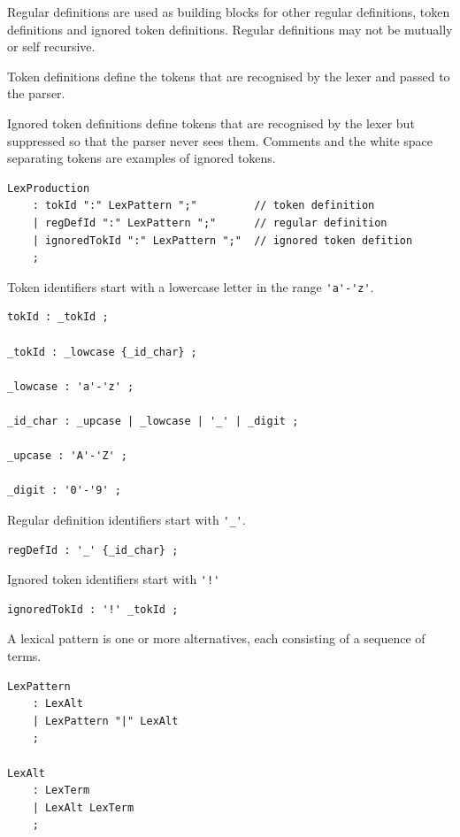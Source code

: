 \documentclass[12pt]{article}
\begin{document}
Regular definitions are used as building blocks for other regular definitions, token definitions and ignored token definitions. Regular definitions may not be mutually or self recursive.

Token definitions define the tokens that are recognised by the lexer and passed to the parser.

Ignored token definitions define tokens that are recognised by the lexer but suppressed so that the parser never sees them. Comments and the white space separating tokens are examples of ignored tokens.

\begin{Verbatim}[frame=single]
LexProduction
    : tokId ":" LexPattern ";"         // token definition
    | regDefId ":" LexPattern ";"      // regular definition
    | ignoredTokId ":" LexPattern ";"  // ignored token defition
    ;
\end{Verbatim}

Token identifiers start with a lowercase letter in the range \verb|'a'-'z'|.

\begin{Verbatim}[frame=single]
tokId : _tokId ;

_tokId : _lowcase {_id_char} ;

_lowcase : 'a'-'z' ;

_id_char : _upcase | _lowcase | '_' | _digit ;

_upcase : 'A'-'Z' ;

_digit : '0'-'9' ;
\end{Verbatim}

Regular definition identifiers start with \verb|'_'|.

\begin{Verbatim}[frame=single]
regDefId : '_' {_id_char} ;
\end{Verbatim}

Ignored token identifiers start with \verb|'!'|

\begin{Verbatim}[frame=single]
ignoredTokId : '!' _tokId ;
\end{Verbatim}

A lexical pattern is one or more alternatives, each consisting of a sequence of terms.

\begin{Verbatim}[frame=single]
LexPattern
    : LexAlt
    | LexPattern "|" LexAlt
    ;

LexAlt
    : LexTerm
    | LexAlt LexTerm
    ;
\end{Verbatim}
\end{document}
